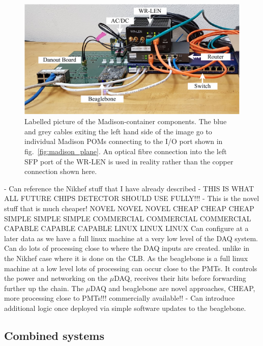 \begin{figure} %
    \includegraphics[width=\textwidth]{diagrams/5-daq/madison_box.pdf}
    \caption[Labelled picture of the Madison-container components.]
    {Labelled picture of the Madison-container components. The blue and grey cables exiting the
        left hand side of the image go to individual Madison POMs connecting to the I/O port shown
        in fig.~\ref{fig:madison_plane}. An optical fibre connection into the left SFP port of the
        WR-LEN is used in reality rather than the copper connection shown here.}
    \label{fig:madison_box}
\end{figure}

- Can reference the Nikhef stuff that I have already described - THIS IS WHAT ALL FUTURE CHIPS
DETECTOR SHOULD USE FULLY!!! - This is the novel stuff that is much cheaper! NOVEL NOVEL NOVEL
CHEAP CHEAP CHEAP SIMPLE SIMPLE SIMPLE COMMERCIAL COMMERCIAL COMMERCIAL CAPABLE CAPABLE CAPABLE
LINUX LINUX LINUX Can configure at a later data as we have a full linux machine at a very low
level of the DAQ system. Can do lots of processing close to where the DAQ inputs are created.
unlike in the Nikhef case where it is done on the CLB. As the beaglebone is a full linux machine
at a low level lots of processing can occur close to the PMTs. It controls the power and
networking on the $\mu$DAQ, receives their hits before forwarding further up the chain. The
$\mu$DAQ and beaglebone are novel approaches, CHEAP, more processing close to PMTs!!! commercially
available!!
- Can introduce additional logic once deployed via simple software updates to the beaglebone.

\subsection{Combined systems} %
\label{sec:daq_hard_combined} %

